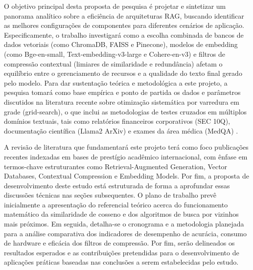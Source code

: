 O objetivo principal desta proposta de pesquisa é projetar e sintetizar um panorama analítico sobre a eficiência de arquiteturas RAG, buscando identificar as melhores configurações de componentes para diferentes cenários de aplicação. Especificamente, o trabalho investigará como a escolha combinada de bancos de dados vetoriais (como ChromaDB, FAISS e Pinecone), modelos de embedding (como Bge-en-small, Text-embedding-v3-large e Cohere-en-v3) e filtros de compressão contextual (limiares de similaridade e redundância) afetam o equilíbrio entre o gerenciamento de recursos e a qualidade do texto final gerado pelo modelo. Para dar sustentação teórica e metodológica a este projeto, a pesquisa tomará como base empírica e ponto de partida os dados e parâmetros discutidos na literatura recente sobre otimização sistemática por varredura em grade (grid-search), o que inclui as metodologias de testes cruzados em múltiplos domínios textuais, tais como relatórios financeiros corporativos (SEC 10Q), documentação científica (Llama2 ArXiv) e exames da área médica (MedQA) \cite{sakar2025rag}.  

A revisão de literatura que fundamentará este projeto terá como foco publicações recentes indexadas em bases de prestígio acadêmico internacional, com ênfase em termos-chave estruturantes como Retrieval-Augmented Generation, Vector Databases, Contextual Compression e Embedding Models. Por fim, a proposta de desenvolvimento deste estudo está estruturada de forma a aprofundar essas discussões técnicas nas seções subsequentes. O plano de trabalho prevê inicialmente a apresentação do referencial teórico acerca do funcionamento matemático da similaridade de cosseno e dos algoritmos de busca por vizinhos mais próximos. Em seguida, detalha-se o cronograma e a metodologia planejada para a análise comparativa dos indicadores de desempenho de acurácia, consumo de hardware e eficácia dos filtros de compressão. Por fim, serão delineados os resultados esperados e as contribuições pretendidas para o desenvolvimento de aplicações práticas baseadas nas conclusões a serem estabelecidas pelo estudo. 